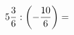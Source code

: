 \documentclass[preview]{standalone}
\begin{document}
\begin{align*}
5 { 3 \over 6 }  :  \left( - { 10 \over 6 } \right)  =
\end{align*}
\end{document}
